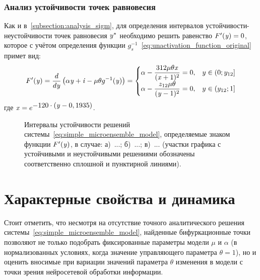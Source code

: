 \subsubsection{Анализ устойчивости точек равновесия}

Как и в~\autoref{subsection:analysis_sigm}, для определения интервалов устойчивости-неустойчивости точек равновесия $\mathit{y}^{*}$ необходимо решить равенство $F^{\prime}(\mathit{y}) = 0$, которое с учётом определения функции $g^{-1}_{s}$~\eqref{eq:unactivation_function_original} примет вид:
\begin{equation}
\nonumber
    F^{\prime}(\mathit{y}) = \dfrac{d}{d\mathit{y}}\left( \alpha \mathit{y} + \mathit{i} - \mu \theta g^{-1}(\mathit{y}) \right) = 
    \begin{cases}
        \alpha - \dfrac{312 \mu \theta \mathit{x}}{(\mathit{x} + 1)^{2}} = 0,   & y \in \left(0; y_{12}\right] \\
        \alpha - \dfrac{z_{12} \mu \theta}{(\mathit{y} - 1)^{2}} = 0,           & y \in \left(y_{12}; 1\right] \\
    \end{cases}
\end{equation}
где $\mathit{x} = e^{\displaystyle -120 \cdot (\mathit{y} - 0,1935)}$.

\begin{figure}[ht]
    \begin{minipage}{\textwidth}
        \caption{Интервалы устойчивости решений системы~\eqref{eq:simple_microensemble_model}, определяемые знаком функции $F^{\prime}(\mathit{y})$, в случае: а)~...; б)~...; в)~... (участки графика с устойчивыми и неустойчивыми решениями обозначены соответственно сплошной и пунктирной линиями).}
        \label{fig:analysis_origin_stability}
    \end{minipage}
\end{figure}


\newpage
\section{Характерные свойства и динамика} \label{section:neuron_dynamic}

Стоит отметить, что несмотря на отсутствие точного аналитического решения системы~\eqref{eq:simple_microensemble_model}, найденные бифуркационные точки позволяют не только подобрать фиксированные параметры модели $\mu$ и $\alpha$ (в нормализованных условиях, когда значение управляющего параметра $\theta = 1$), но и оценить вносимые при вариации значений параметра $\theta$ изменения в модели с точки зрения нейросетевой обработки информации.

